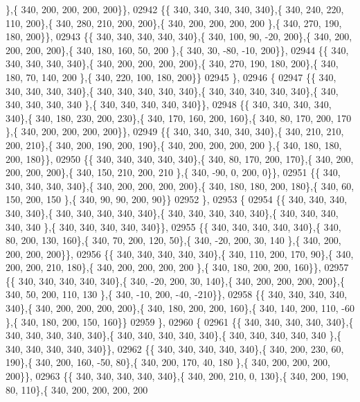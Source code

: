 \begin{DoxyCode}
      \},\{ 340, 200, 200, 200, 200\}\},
02942 \{\{ 340, 340, 340, 340, 340\},\{ 340, 240, 220, 110, 200\},\{ 340, 280, 210, 200, 200\},\{ 340, 200, 200, 200, 200
      \},\{ 340, 270, 190, 180, 200\}\},
02943 \{\{ 340, 340, 340, 340, 340\},\{ 340, 100,  90, -20, 200\},\{ 340, 200, 200, 200, 200\},\{ 340, 180, 160,  50, 200
      \},\{ 340,  30, -80, -10, 200\}\},
02944 \{\{ 340, 340, 340, 340, 340\},\{ 340, 200, 200, 200, 200\},\{ 340, 270, 190, 180, 200\},\{ 340, 180,  70, 140, 200
      \},\{ 340, 220, 100, 180, 200\}\}
02945 \},
02946 \{
02947 \{\{ 340, 340, 340, 340, 340\},\{ 340, 340, 340, 340, 340\},\{ 340, 340, 340, 340, 340\},\{ 340, 340, 340, 340, 340
      \},\{ 340, 340, 340, 340, 340\}\},
02948 \{\{ 340, 340, 340, 340, 340\},\{ 340, 180, 230, 200, 230\},\{ 340, 170, 160, 200, 160\},\{ 340,  80, 170, 200, 170
      \},\{ 340, 200, 200, 200, 200\}\},
02949 \{\{ 340, 340, 340, 340, 340\},\{ 340, 210, 210, 200, 210\},\{ 340, 200, 190, 200, 190\},\{ 340, 200, 200, 200, 200
      \},\{ 340, 180, 180, 200, 180\}\},
02950 \{\{ 340, 340, 340, 340, 340\},\{ 340,  80, 170, 200, 170\},\{ 340, 200, 200, 200, 200\},\{ 340, 150, 210, 200, 210
      \},\{ 340, -90,   0, 200,   0\}\},
02951 \{\{ 340, 340, 340, 340, 340\},\{ 340, 200, 200, 200, 200\},\{ 340, 180, 180, 200, 180\},\{ 340,  60, 150, 200, 150
      \},\{ 340,  90,  90, 200,  90\}\}
02952 \},
02953 \{
02954 \{\{ 340, 340, 340, 340, 340\},\{ 340, 340, 340, 340, 340\},\{ 340, 340, 340, 340, 340\},\{ 340, 340, 340, 340, 340
      \},\{ 340, 340, 340, 340, 340\}\},
02955 \{\{ 340, 340, 340, 340, 340\},\{ 340,  80, 200, 130, 160\},\{ 340,  70, 200, 120,  50\},\{ 340, -20, 200,  30, 140
      \},\{ 340, 200, 200, 200, 200\}\},
02956 \{\{ 340, 340, 340, 340, 340\},\{ 340, 110, 200, 170,  90\},\{ 340, 200, 200, 210, 180\},\{ 340, 200, 200, 200, 200
      \},\{ 340, 180, 200, 200, 160\}\},
02957 \{\{ 340, 340, 340, 340, 340\},\{ 340, -20, 200,  30, 140\},\{ 340, 200, 200, 200, 200\},\{ 340,  50, 200, 110, 130
      \},\{ 340, -10, 200, -40, -210\}\},
02958 \{\{ 340, 340, 340, 340, 340\},\{ 340, 200, 200, 200, 200\},\{ 340, 180, 200, 200, 160\},\{ 340, 140, 200, 110, -60
      \},\{ 340, 180, 200, 150, 160\}\}
02959 \},
02960 \{
02961 \{\{ 340, 340, 340, 340, 340\},\{ 340, 340, 340, 340, 340\},\{ 340, 340, 340, 340, 340\},\{ 340, 340, 340, 340, 340
      \},\{ 340, 340, 340, 340, 340\}\},
02962 \{\{ 340, 340, 340, 340, 340\},\{ 340, 200, 230,  60, 190\},\{ 340, 200, 160, -50,  80\},\{ 340, 200, 170,  40, 180
      \},\{ 340, 200, 200, 200, 200\}\},
02963 \{\{ 340, 340, 340, 340, 340\},\{ 340, 200, 210,   0, 130\},\{ 340, 200, 190,  80, 110\},\{ 340, 200, 200, 200, 200

\end{DoxyCode}
